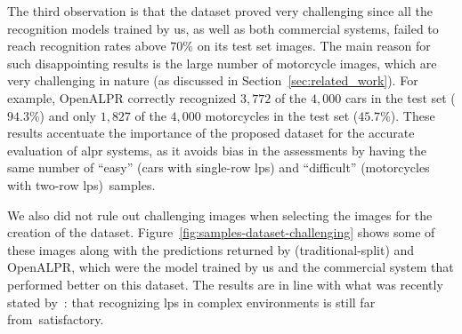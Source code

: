 The third observation is that the \dataset dataset proved very challenging since all the recognition models trained by us, as well as both commercial systems, failed to reach recognition rates above $70$\% on its test set images. 
The main reason for such disappointing results is the large number of motorcycle images, which are very challenging in nature (as discussed in Section~\ref{sec:related_work}).
For example, OpenALPR correctly recognized $3{,}772$ of the $4{,}000$ cars in the test set ($94.3$\%) and only $1{,}827$ of the $4{,}000$ motorcycles in the test set ($45.7$\%).
These results accentuate the importance of the proposed dataset for the accurate evaluation of \gls*{alpr} systems, as it avoids bias in the assessments by having the same number of ``easy'' (cars with single-row \glspl*{lp}) and ``difficult'' (motorcycles with two-row \glspl*{lp})~samples.

We also did not rule out challenging images when selecting the images for the creation of the dataset.
Figure~\ref{fig:samples-dataset-challenging} shows some of these images along with the predictions returned by \trba (traditional-split) and OpenALPR, which were the model trained by us and the commercial system that performed better on this dataset.
The results are in line with what was recently stated by~\cite{zhang2021robust_attentional}: that recognizing \glspl*{lp} in complex environments is still far from~satisfactory.

